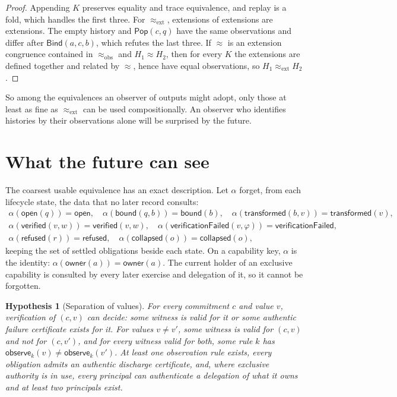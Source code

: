 \documentclass[11pt,openany]{book}
\newtheorem{hypothesis}[theorem]{Hypothesis}
\theoremstyle{remark}
\newcommand{\Pop}{\mathsf{Pop}}
\newcommand{\Bind}{\mathsf{Bind}}
\begin{document}
\begin{proof}
Appending $K$ preserves equality and trace equivalence, and replay is a
fold, which handles the first three. For $\approx_{\mathrm{ext}}$,
extensions of extensions are extensions. The empty history and $\Pop(c,q)$
have the same observations and differ after $\Bind(a,c,b)$, which refutes
the last three. If $\approx$ is an extension congruence contained in
$\approx_{\mathrm{obs}}$ and $H_1\approx H_2$, then for every $K$ the
extensions are defined together and related by $\approx$, hence have equal
observations, so $H_1\approx_{\mathrm{ext}}H_2$.
\end{proof}

So among the equivalences an observer of outputs might adopt, only those
at least as fine as $\approx_{\mathrm{ext}}$ can be used compositionally.
An observer who identifies histories by their observations alone will be
surprised by the future.

\section{What the future can see}

The coarsest usable equivalence has an exact description. Let $\alpha$
forget, from each lifecycle state, the data that no later record consults:
\[
\begin{gathered}
\alpha(\mathsf{open}(q))=\mathsf{open},\quad
\alpha(\mathsf{bound}(q,b))=\mathsf{bound}(b),\quad
\alpha(\mathsf{transformed}(b,v))=\mathsf{transformed}(v),\\
\alpha(\mathsf{verified}(v,w))=\mathsf{verified}(v,w),\quad
\alpha(\mathsf{verificationFailed}(v,\varphi))=\mathsf{verificationFailed},\\
\alpha(\mathsf{refused}(r))=\mathsf{refused},\quad
\alpha(\mathsf{collapsed}(o))=\mathsf{collapsed}(o),
\end{gathered}
\]
keeping the set of settled obligations beside each state. On a
capability key, $\alpha$ is the identity: $\alpha(\mathsf{owner}(a))=
\mathsf{owner}(a)$. The current holder of an exclusive capability is
consulted by every later exercise and delegation of it, so it cannot be
forgotten.

\begin{hypothesis}[Separation of values]\label{hyp:sep}
For every commitment $c$ and value $v$, verification of $(c,v)$ can
decide: some witness is valid for it or some authentic failure certificate
exists for it. For values $v\ne v'$, some witness is valid for $(c,v)$ and
not for $(c,v')$, and for every witness valid for both, some rule $k$ has
$\mathsf{observe}_k(v)\ne\mathsf{observe}_k(v')$. At least one observation
rule exists, every obligation admits an authentic discharge
certificate, and, where exclusive authority is in use, every principal can
authenticate a delegation of what it owns and at least two principals
exist.
\end{hypothesis}
\end{document}
